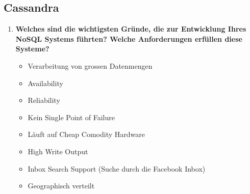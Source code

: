 \documentclass[a4paper,10pt,titlepage=false]{scrreprt}
\begin{document}
\begin{itemize}
\section{Cassandra} %
\label{sec:cassandra}
\begin{enumerate}
  \item \textbf{Welches sind die wichtigsten Gründe, die zur Entwicklung Ihres NoSQL Systems führten? Welche Anforderungen erfüllen diese Systeme?}\\
  \begin{itemize}
    \item Verarbeitung von grossen Datenmengen
\item Availability
\item Reliability   
\item Kein Single Point of Failure
\item Läuft auf Cheap Comodity Hardware
\item High Write Output
\item Inbox Search Support (Suche durch die Facebook Inbox)
\item Geographisch verteilt


\end{itemize}
\end{enumerate}
\end{itemize}
\end{document}
